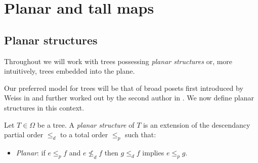 \documentclass[a4paper,10pt]{article}%
\begin{document}
\section{Planar and tall maps}

\subsection{Planar structures}


Throughout we will work with trees possessing \textit{planar structures} or, more intuitively, trees embedded into the plane.

Our preferred model for trees will be that of broad posets first introduced by Weiss in \cite{We12} and further worked out by the second author in \cite{Pe17}. We now define planar structures in this context.


\begin{definition}\label{PLANARIZE DEF}
  Let $T \in \Omega$ be a tree. A \textit{planar structure} of $T$ is an extension of the descendancy partial order $\leq_d$ to a total order $\leq_p$ such that: 
  \begin{itemize}
  \item \textit{Planar}: if $e \leq_p f$ and $e \nleq_d f$ then 
    $g \leq_d f$ implies $e \leq_p g$.
  \end{itemize} 
\end{definition}
\end{document}
